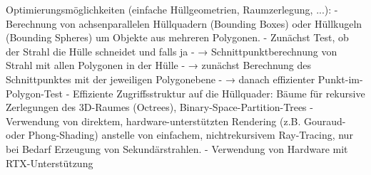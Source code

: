\documentclass[10pt,landscape]{article}
\begin{document}
\begin{multicols}{3}
Optimierungsmöglichkeiten (einfache Hüllgeometrien, Raumzerlegung, ...):
- Berechnung von achsenparallelen Hüllquadern (Bounding Boxes) oder Hüllkugeln (Bounding Spheres) um Objekte aus mehreren Polygonen.
  - Zunächst Test, ob der Strahl die Hülle schneidet und falls ja
  - → Schnittpunktberechnung von Strahl mit allen Polygonen in der Hülle
  - → zunächst Berechnung des Schnittpunktes mit der jeweiligen Polygonebene
  - → danach effizienter Punkt-im-Polygon-Test
- Effiziente Zugriffsstruktur auf die Hüllquader: Bäume für rekursive Zerlegungen des 3D-Raumes (Octrees), Binary-Space-Partition-Trees
- Verwendung von direktem, hardware-unterstützten Rendering (z.B. Gouraud- oder Phong-Shading) anstelle von einfachem, nichtrekursivem Ray-Tracing, nur bei Bedarf Erzeugung von Sekundärstrahlen.
- Verwendung von Hardware mit RTX-Unterstützung


\end{multicols}
\end{document}
